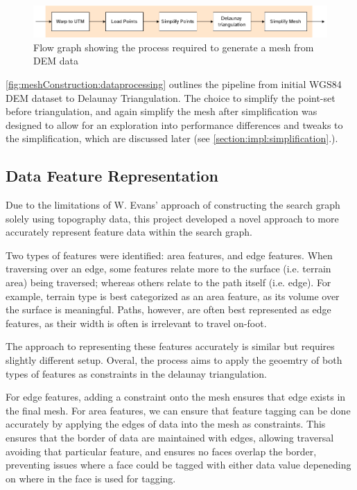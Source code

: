 \documentclass[12pt]{article}
\begin{document}
\begin{figure}[!htbp]
  \centering
  \includegraphics[width=1\textwidth]{assets/meshConstruction-zoomed.png}
  \caption{Flow graph showing the process required to generate a mesh from DEM data}\label{fig:meshConstruction:dataprocessing}
\end{figure}

\autoref{fig:meshConstruction:dataprocessing} outlines the pipeline from initial WGS84 DEM dataset to Delaunay Triangulation. The choice to simplify the point-set before triangulation, and again simplify the mesh after simplification was designed to allow for an exploration into performance differences and tweaks to the simplification, which are discussed later (see \autoref{section:impl:simplification}.).

\subsection{Data Feature Representation}\label{section:design:mesh:dataFeatures}

Due to the limitations of W. Evans' approach of constructing the search graph solely using topography data, this project developed a novel approach to more accurately represent feature data within the search graph.

Two types of features were identified: area features, and edge features. When traversing over an edge, some features relate more to the surface (i.e. terrain area) being traversed; whereas others relate to the path itself (i.e. edge). For example, terrain type is best categorized as an area feature, as its volume over the surface is meaningful. Paths, however, are often best represented as edge features, as their width is often is irrelevant to travel on-foot.

The approach to representing these features accurately is similar but requires slightly different setup. Overal, the process aims to apply the geoemtry of both types of features as constraints in the delaunay triangulation.

For edge features, adding a constraint onto the mesh ensures that edge exists in the final mesh. For area features, we can ensure that feature tagging can be done accurately by applying the edges of data into the mesh as constraints. This ensures that the border of data are maintained with edges, allowing traversal avoiding that particular feature, and ensures no faces overlap the border, preventing issues where a face could be tagged with either data value depeneding on where in the face is used for tagging.
\end{document}
